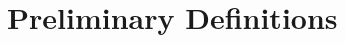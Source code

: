 \documentclass[../main.tex]{subfiles}
\begin{document}
\section{Preliminary Definitions}
\end{document}
